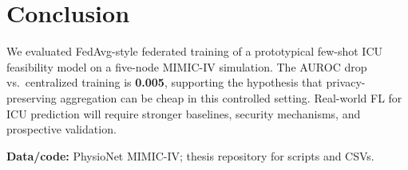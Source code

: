 \section{Conclusion}
\label{sec:conc}

We evaluated FedAvg-style federated training of a prototypical few-shot ICU feasibility model on a five-node MIMIC-IV simulation. The AUROC drop vs.\ centralized training is \textbf{0.005}, supporting the hypothesis that privacy-preserving aggregation can be cheap in this controlled setting. Real-world FL for ICU prediction will require stronger baselines, security mechanisms, and prospective validation.

\textbf{Data/code:} PhysioNet MIMIC-IV; thesis repository for scripts and CSVs.
